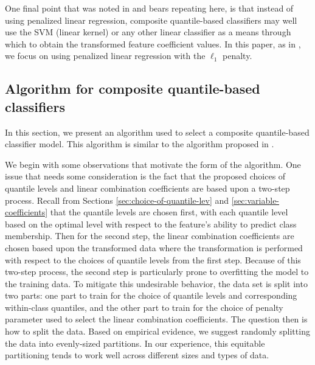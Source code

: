 One final point that was noted in \cite{fan2016} and bears repeating here, is
that instead of using penalized linear regression, composite quantile-based
classifiers may well use the SVM (linear kernel) or any other linear classifier
as a means through which to obtain the transformed feature coefficient values.
In this paper, as in \cite{fan2016}, we focus on using penalized linear
regression with the $\ell_1$ penalty.




\subsection{Algorithm for composite quantile-based classifiers}
\label{sec:classifier-algorithm}

In this section, we present an algorithm used to select a composite
quantile-based classifier model.  This algorithm is similar to the algorithm
proposed in \cite{fan2016}.

We begin with some observations that motivate the form of the algorithm.  One
issue that needs some consideration is the fact that the proposed choices of
quantile levels and linear combination coefficients are based upon a two-step
process.  Recall from Sections \ref{sec:choice-of-quantile-lev} and
\ref{sec:variable-coefficients} that the quantile levels are chosen first, with
each quantile level based on the optimal level with respect to the feature's
ability to predict class membership.  Then for the second step, the linear
combination coefficients are chosen based upon the transformed data where the
transformation is performed with respect to the choices of quantile levels from
the first step.  Because of this two-step process, the second step is
particularly prone to overfitting the model to the training data.  To mitigate
this undesirable behavior, the data set is split into two parts: one part to
train for the choice of quantile levels and corresponding within-class
quantiles, and the other part to train for the choice of penalty parameter used
to select the linear combination coefficients.  The question then is how to
split the data.  Based on empirical evidence, we suggest randomly splitting the
data into evenly-sized partitions.  In our experience, this equitable
partitioning tends to work well across different sizes and types of data.

